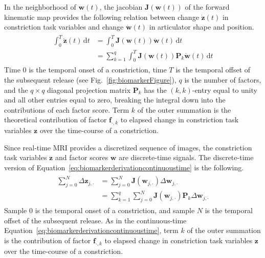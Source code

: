 \documentclass[preprint]{JASAnew}\usepackage[]{graphicx}\usepackage[]{color}
\begin{document}
In the neighborhood of $\mathbf{w}(t)$, the jacobian $\mathbf{J}(\mathbf{w}(t))$ of the forward kinematic map provides the following relation between change $\mathbf{\dot{z}}(t)$ in constriction task variables and change $\mathbf{\dot{w}}(t)$ in articulator shape and position.
%
\begin{align}
\label{eq:biomarkerderivationcontinuoustime}
\begin{split}
\int_{0}^{T} \mathbf{\dot{z}}(t) \, \mathrm{d}t
	&= \int_{0}^{T} \mathbf{J}\left( \mathbf{w}(t) \right) \mathbf{\dot{w}}(t) \, \mathrm{d}t \\
    &= \sum_{k=1}^q \int_{0}^{T} \mathbf{J}\left( \mathbf{w}(t) \right) \mathbf{P}_k \mathbf{\dot{w}}(t) \, \mathrm{d}t
\end{split}
\end{align}
%
Time $0$ is the temporal onset of a constriction, time $T$ is the temporal offset of the subsequent release (see Fig.~\ref{fig:biomarkerFigure}), $q$ is the number of factors, and the $q\times q$ diagonal projection matrix $\mathbf{P}_k$ has the $(k,k)$-entry equal to unity and all other entries equal to zero, breaking the integral down into the contributions of each factor score.
Term $k$ of the outer summation is the theoretical contribution of factor $\mathbf{f}_{\cdot,k}$ to elapsed change in constriction task variables $\mathbf{z}$ over the time-course of a constriction. 

Since real-time MRI provides a discretized sequence of images, the constriction task variables $\mathbf{z}$ and factor scores $\mathbf{w}$ are discrete-time signals. 
%
The discrete-time version of Equation~\ref{eq:biomarkerderivationcontinuoustime} is the following.
%
\begin{align}
\label{eq:discretetimedeltaz}
\begin{split}
\sum_{j=0}^{N} \Delta \mathbf{z}_{j,\cdot}
	&= \sum_{j=0}^{N} \mathbf{J}\left( \mathbf{w}_{j,\cdot} \right) \Delta \mathbf{w}_{j,\cdot} \\
    &= \sum_{k=1}^q \sum_{j=0}^{N} \mathbf{J}\left( \mathbf{w}_{j,\cdot} \right) \mathbf{P}_k \Delta \mathbf{w}_{j,\cdot}
\end{split}
\end{align}
%
Sample $0$ is the temporal onset of a constriction, and sample $N$ is the temporal offset of the subsequent release.
%
As in the continuous-time Equation~\ref{eq:biomarkerderivationcontinuoustime}, term $k$ of the outer summation is the contribution of factor $\mathbf{f}_{\cdot,k}$ to elapsed change in constriction task variables $\mathbf{z}$ over the time-course of a constriction.
\end{document}
